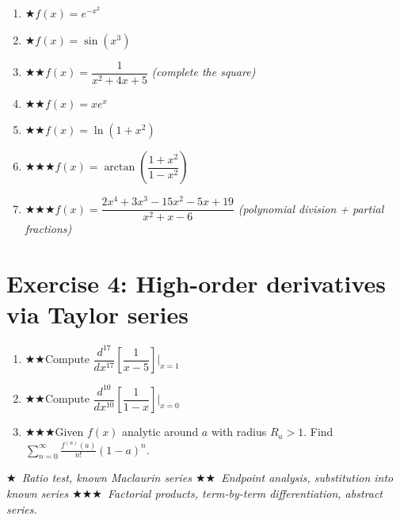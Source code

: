 \documentclass[12pt,a4paper]{article}
\newcommand{\easy}{{\color{green!60!black}$\bigstar$}}
\newcommand{\medium}{{\color{orange}$\bigstar\bigstar$}}
\newcommand{\hard}{{\color{red}$\bigstar\bigstar\bigstar$}}
\begin{document}
\begin{enumerate}[leftmargin=*, label=(\alph*)]

\item \easy\quad $f(x) = e^{-x^2}$

\item \easy\quad $f(x) = \sin(x^3)$

\item \medium\quad $f(x) = \dfrac{1}{x^2+4x+5}$
\quad\emph{(complete the square)}

\item \medium\quad $f(x) = xe^x$

\item \medium\quad $f(x) = \ln(1+x^2)$

\item \hard\quad $f(x) = \arctan\!\left(\dfrac{1+x^2}{1-x^2}\right)$

\item \hard\quad $f(x) = \dfrac{2x^4+3x^3-15x^2-5x+19}{x^2+x-6}$
\quad\emph{(polynomial division + partial fractions)}

\end{enumerate}

\section*{Exercise 4: High-order derivatives via Taylor series}

\begin{enumerate}[leftmargin=*, label=(\alph*)]

\item \medium\quad Compute $\dfrac{d^{17}}{dx^{17}}\!\left[\dfrac{1}{x-5}\right]\bigg|_{x=1}$

\item \medium\quad Compute $\dfrac{d^{10}}{dx^{10}}\!\left[\dfrac{1}{1-x}\right]\bigg|_{x=0}$

\item \hard\quad Given $f(x)$ analytic around $a$ with radius $R_a>1$.
Find $\displaystyle\sum_{n=0}^{\infty}\frac{f^{(n)}(a)}{n!}(1-a)^n$.

\end{enumerate}

\bigskip
\begin{center}
\small\itshape
\easy\ Ratio test, known Maclaurin series\quad
\medium\ Endpoint analysis, substitution into known series\quad
\hard\ Factorial products, term-by-term differentiation, abstract series.
\end{center}
\end{document}
